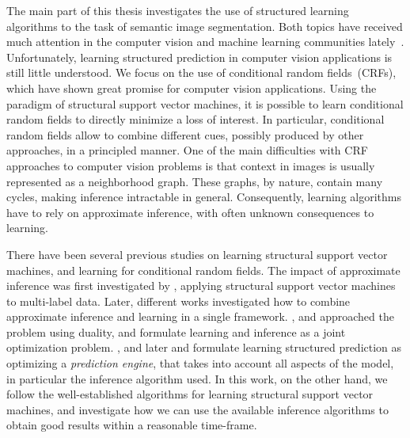 The main part of this thesis investigates the use of structured learning~\citep{taskar2003max, tsochantaridis2006large}
algorithms to the task of semantic image segmentation. Both topics have received
much attention in the computer vision and machine learning communities
lately~\citep{ladicky2009associative, krahenbuhl2012efficient,
branson2013efficient, blake2011markov}.
Unfortunately, learning structured prediction in computer vision applications
is still little understood.
We focus on the use of conditional random fields~(CRFs), which have shown great
promise for computer vision applications. Using the paradigm of structural
support vector machines, it is possible to learn conditional random fields to
directly minimize a loss of interest. In particular, conditional random fields
allow to combine different cues, possibly produced by other approaches, in a
principled manner. One of the main difficulties with CRF approaches to computer
vision problems is that context in images is usually represented as a
neighborhood graph.  These graphs, by nature, contain many cycles, making
inference intractable in general. Consequently, learning algorithms have to
rely on approximate inference, with often unknown consequences to learning.

There have been several previous studies on learning structural support vector
machines, and learning for conditional random fields. The impact of approximate
inference was first investigated by \citet{finley2008training}, applying
structural support vector machines to multi-label data. Later, different works
investigated how to combine approximate inference and learning in a single
framework. \citet{meshi2010learning, komodakis2011efficient}, and
\citet{hazan2010primal} approached the problem using duality, and formulate
learning and inference as a joint optimization problem.
\citet{stoyanov2011empirical}, and later \citet{jancsarylearning} and
\citet{krahenbuhlparameter} formulate learning structured prediction as
optimizing a \emph{prediction engine}, that takes into account all aspects of
the model, in particular the inference algorithm used.
In this work, on the other hand, we follow the well-established algorithms for
learning structural support vector machines, and investigate how we can use the
available inference algorithms to obtain good results within a reasonable
time-frame.

